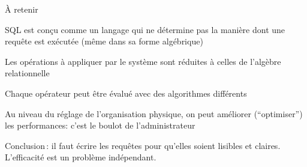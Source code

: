 \begin{frame}{À retenir}



\begin{redbullet}
  \item SQL est conçu comme un langage qui ne détermine
     pas la manière dont une requête est exécutée (\alert{même}
     dans sa forme algébrique)

   \item Les opérations à appliquer par le système sont réduites
        à celles de l'algèbre relationnelle
        
    \item Chaque opérateur peut être évalué avec des algorithmes différents
\end{redbullet}

\vfill

Au niveau du réglage de l'organisation physique, on peut améliorer
(``optimiser'') les performances: c'est le boulot de l'administrateur
\vfill

\alert{Conclusion\,: il faut écrire les requêtes pour qu'elles soient lisibles
et claires}. L'efficacité est un problème indépendant.

\end{frame}
